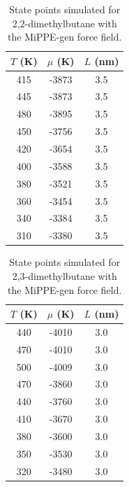\documentclass[journal=jctc,manuscript=article]{achemso}
\begin{document}
\begin{table}[htb!]
	\caption{State points simulated for 2,2-dimethylbutane with the MiPPE-gen force field.}
	\begin{center}
		\begin{tabular}{|c|c|c|}
			\hline
			$T$ (K) & $\mu$ (K) & $L$ (nm) \\ \hline
			415	&	-3873	&	3.5	\\
			445	&	-3873	&	3.5	\\
			480	&	-3895	&	3.5	\\
			450	&	-3756	&	3.5	\\
			420	&	-3654	&	3.5	\\
			400	&	-3588	&	3.5	\\
			380	&	-3521	&	3.5	\\
			360	&	-3454	&	3.5	\\
			340	&	-3384	&	3.5	\\
			310	&	-3380	&	3.5	\\
			\hline
		\end{tabular}
	\end{center}
\end{table}

\begin{table}[htb!]
	\caption{State points simulated for 2,3-dimethylbutane with the MiPPE-gen force field.}
	\begin{center}
		\begin{tabular}{|c|c|c|}
			\hline
			$T$ (K) & $\mu$ (K) & $L$ (nm) \\ \hline
			440	&	-4010	&	3.0	\\
			470	&	-4010	&	3.0	\\
			500	&	-4009	&	3.0	\\
			470	&	-3860	&	3.0	\\
			440	&	-3760	&	3.0	\\
			410	&	-3670	&	3.0	\\
			380	&	-3600	&	3.0	\\
			350	&	-3530	&	3.0	\\
			320	&	-3480	&	3.0	\\
			\hline
		\end{tabular}
	\end{center}
\end{table}
\end{document}
